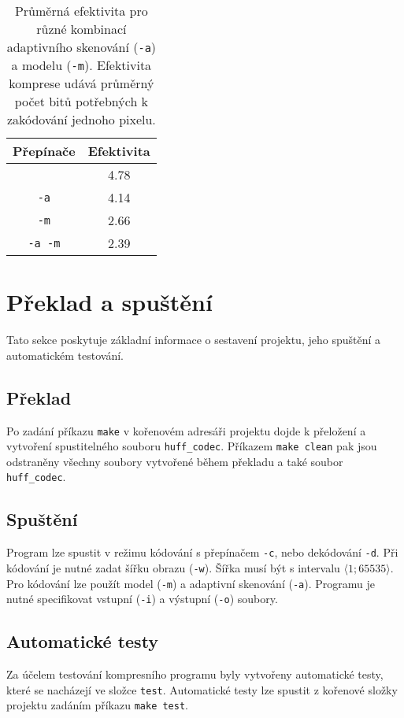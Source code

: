 \documentclass[a4paper, 11pt, fleqn]{scrartcl}
\begin{document}
      \begin{table}[!h]
        \centering
        \captionsetup{justification=justified}
        \begin{tabular}{|c|c|}
          \hline
          Přepínače & Efektivita\\[0.5ex]
          \hline\hline
                         & 4.78\\[0.5ex]
          \texttt{-a}    & 4.14\\[0.5ex]
          \texttt{-m}    & 2.66\\[0.5ex]
          \texttt{-a -m} & 2.39\\[0.5ex]
          \hline
        \end{tabular}
        \caption{Průměrná efektivita pro různé kombinací adaptivního skenování (\texttt{-a}) a modelu (\texttt{-m}). Efektivita komprese udává průměrný počet bitů potřebných k zakódování jednoho pixelu.}
      \end{table}

    \section{Překlad a spuštění}
      Tato sekce poskytuje základní informace o sestavení projektu, jeho spuštění a automatickém testování.

      \subsection{Překlad}
        Po zadání příkazu \texttt{make} v kořenovém adresáři projektu dojde k přeložení a vytvoření spustitelného souboru \texttt{huff\_codec}. Příkazem \texttt{make clean} pak jsou odstraněny všechny soubory vytvořené během překladu a také soubor \texttt{huff\_codec}.

      \subsection{Spuštění}
        Program lze spustit v režimu kódování s přepínačem \texttt{-c}, nebo dekódování \texttt{-d}. Při kódování je nutné zadat šířku obrazu (\texttt{-w}). Šířka musí být s intervalu $\langle 1; 65535 \rangle$. Pro kódování lze použít model (\texttt{-m}) a adaptivní skenování (\texttt{-a}). Programu je nutné specifikovat vstupní (\texttt{-i}) a výstupní (\texttt{-o}) soubory.

      \subsection{Automatické testy}
        Za účelem testování kompresního programu byly vytvořeny automatické testy, které se nacházejí ve složce \texttt{test}. Automatické testy lze spustit z kořenové složky projektu zadáním příkazu \texttt{make test}.
\end{document}
